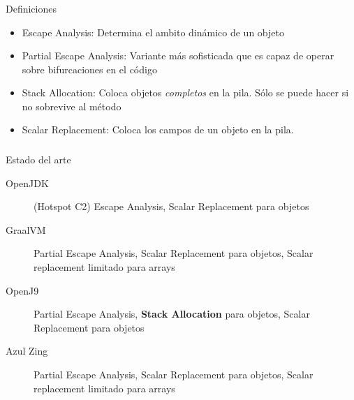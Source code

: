 \begin{frame}[fragile]
  \frametitle{\ft}
  \begin{block}{Definiciones}
    \begin{itemize}
    \item Escape Analysis: Determina el ambito dinámico de un objeto
    \item Partial Escape Analysis: Variante más sofisticada que es capaz de
      operar sobre bifurcaciones en el código
    \item Stack Allocation: Coloca objetos {\it completos} en la pila.
      Sólo se puede hacer si no sobrevive al método
    \item Scalar Replacement: Coloca los campos de un objeto en la pila.
    \end{itemize}
  \end{block}
\end{frame}


\begin{frame}[fragile]
  \frametitle{\ft}
  \begin{block}{Estado del arte}
    \begin{description}
    \item[OpenJDK] (Hotspot C2)
      Escape Analysis,
      Scalar Replacement para objetos
    \item[GraalVM]
      Partial Escape Analysis,
      Scalar Replacement para objetos,
      Scalar replacement limitado para arrays
    \item[OpenJ9]
      Partial Escape Analysis,
      {\bf Stack Allocation} para objetos,
      Scalar Replacement para objetos
    \item[Azul Zing]
      Partial Escape Analysis,
      Scalar Replacement para objetos,
      Scalar replacement limitado para arrays
    \end{description}
  \end{block}
\end{frame}
